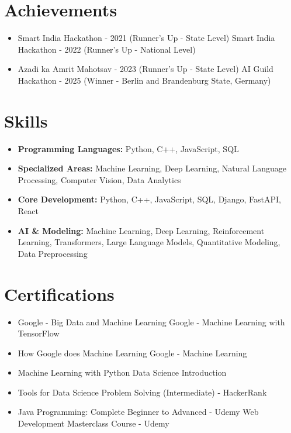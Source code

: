 \documentclass[a4paper,10pt]{article}
\begin{document}
\section*{Achievements}
\begin{itemize}
\item Smart India Hackathon - 2021 (Runner's Up - State Level) \hfill Smart India Hackathon - 2022 (Runner's Up - National Level)
\item Azadi ka Amrit Mahotsav - 2023 (Runner's Up - State Level) \hfill AI Guild Hackathon - 2025 (Winner - Berlin and Brandenburg State, Germany)
\end{itemize}

\section*{Skills}
\begin{itemize}
  \item \textbf{Programming Languages:} Python, C++, JavaScript, SQL
  \item \textbf{Specialized Areas:} Machine Learning, Deep Learning, Natural Language Processing, Computer Vision, Data Analytics
  \item \textbf{Core Development:} Python, C++, JavaScript, SQL, Django, FastAPI, React
  \item \textbf{AI \& Modeling:} Machine Learning, Deep Learning, Reinforcement Learning, Transformers, Large Language Models, Quantitative Modeling, Data Preprocessing
\end{itemize}

\section*{Certifications}
\begin{itemize}
\item Google - Big Data and Machine Learning \hfill Google - Machine Learning with TensorFlow
\item How Google does Machine Learning \hfill Google - Machine Learning
\item Machine Learning with Python \hfill Data Science Introduction
\item Tools for Data Science \hfill Problem Solving (Intermediate) - HackerRank
\item Java Programming: Complete Beginner to Advanced - Udemy \hfill Web Development Masterclass Course - Udemy
\end{itemize}
\end{document}
